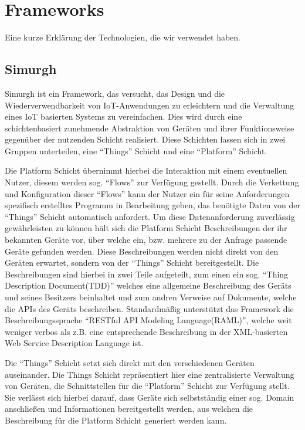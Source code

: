 \documentclass[conference,compsoc]{IEEEtran}
\begin{document}
\section{Frameworks}
Eine kurze Erklärung der Technologien, die wir verwendet haben.

\subsection{Simurgh}

Simurgh ist ein Framework, das versucht, das Design und die Wiederverwendbarkeit von IoT-Anwendungen zu erleichtern und die Verwaltung eines IoT basierten Systems zu vereinfachen. Dies wird  durch eine schichtenbasiert zunehmende Abstraktion von Geräten und ihrer Funktionsweise gegenüber der nutzenden Schicht realisiert. Diese Schichten lassen sich in zwei Gruppen unterteilen, eine \enquote{Things} Schicht und eine \enquote{Platform} Schicht.

Die Platform Schicht übernimmt hierbei die Interaktion mit einem eventuellen Nutzer, diesem werden sog. \enquote{Flows} zur Verfügung gestellt. Durch die Verkettung und Konfiguration dieser \enquote{Flows} kann der Nutzer ein für seine Anforderungen spezifisch erstelltes Programm in Bearbeitung geben, das benötigte Daten von der \enquote{Things} Schicht automatisch anfordert. Um diese Datenanforderung zuverlässig gewährleisten zu können hält sich die Platform Schicht Beschreibungen der ihr bekannten Geräte vor, über welche ein, bzw. mehrere zu der Anfrage passende Geräte gefunden werden. Diese Beschreibungen werden nicht direkt von den Geräten erwartet, sondern von der \enquote{Things} Schicht bereitgestellt. Die Beschreibungen sind hierbei in zwei Teile aufgeteilt, zum einen ein sog. \enquote{Thing Description Document(TDD)} welches eine allgemeine Beschreibung des Geräts und seines Besitzers beinhaltet und zum andren Verweise auf Dokumente, welche die APIs des Geräts beschreiben. Standardmäßig unterstützt das Framework die Beschreibungssprache \enquote{RESTful API Modeling Language(RAML)}, welche weit weniger verbos als z.B. eine entsprechende Beschreibung in der XML-basierten Web Service Description Language ist.

Die \enquote{Things} Schicht setzt sich direkt mit den verschiedenen Geräten auseinander. Die Things Schicht repräsentiert hier eine zentralisierte Verwaltung von Geräten, die Schnittstellen für die \enquote{Platform} Schicht zur Verfügung stellt. Sie verlässt sich hierbei darauf, dass Geräte sich selbstständig einer sog. Domain anschließen und Informationen bereitgestellt werden, aus welchen die Beschreibung für die Platform Schicht generiert werden kann.
\end{document}
